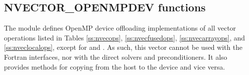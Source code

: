 \subsection{NVECTOR\_OPENMPDEV functions}
\label{ss:nvec_openmpdev_functions}

The {\nvecopenmpdev} module defines OpenMP device offloading implementations of
all vector operations listed in Tables \ref{ss:nvecops}, \ref{ss:nvecfusedops},
\ref{ss:nvecarrayops}, and \ref{ss:nveclocalops}, except for  and
. As such, this vector cannot be used with the
{\sundials} Fortran interfaces, nor with the {\sundials} direct solvers and
preconditioners. It also provides methods for copying from the host to
the device and vice versa.

